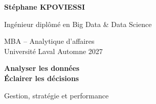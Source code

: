 \documentclass[10pt,a4paper]{article}
\begin{document}
\fontsize{10pt}{12.6pt}\selectfont
\begin{minipage}[t]{0.55\textwidth}
{\fontsize{22pt}{25pt}\selectfont\bfseries\color{accent}Stéphane KPOVIESSI}\par
Ingénieur diplômé en Big Data \& Data Science\par
{\color{muted}MBA -- Analytique d'affaires\\Université Laval \textbullet{} Automne 2027}
\end{minipage}\hfill
\begin{minipage}[t]{0.40\textwidth}
\raggedleft
{\bfseries\color{accent}Analyser les données\\Éclairer les décisions}\par
\vspace{4pt}
{\color{muted}Gestion, stratégie et performance}
\end{minipage}
\vspace{7pt}
\vspace{1pt}
\vspace{8pt}
\end{document}
